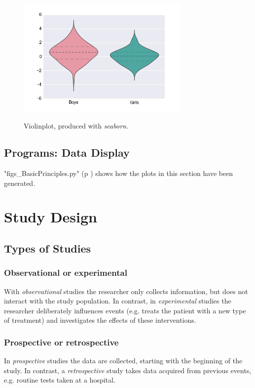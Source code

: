 \begin{figure}
  \centering
  \includegraphics[width=0.75\textwidth]{../Images/violinplot.png}\\
  \caption{Violinplot, produced with \emph{seaborn}.}\label{fig:violin}
\end{figure}

\subsection{Programs: Data Display}
\PyImg "figs\_BasicPrinciples.py" (p \pageref{py:BasicPrinciples}) shows how the plots in this section have been generated.

\section{Study Design}


\subsection{Types of Studies}

\subsubsection{Observational or experimental}
With \emph{observational} studies the researcher only collects information, but does not interact with the study population. In contrast, in \emph{experimental} studies the researcher deliberately influences events (e.g. treats the patient with a new type of treatment) and investigates the effects of these interventions.

\subsubsection{Prospective or retrospective}
In \emph{prospective} studies the data are collected, starting with the beginning of the study. In contrast, a \emph{retrospective} study takes data acquired from previous events, e.g. routine tests taken at a hospital.

